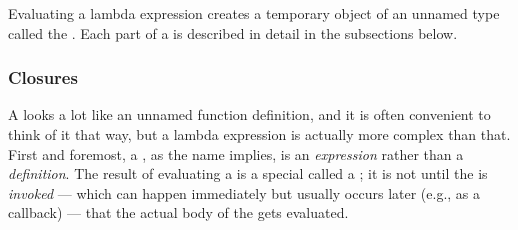 Evaluating a lambda expression creates a temporary 
object of an unnamed type called the . Each part of
a  is described in detail in the subsections
below.

\subsubsection[Closures]{Closures}\label{closures}

A  looks a lot like an unnamed function
definition, and it is often convenient to think of it that way, but a
lambda expression is actually more complex than that. First and
foremost, a , as the name implies, is an
\emph{expression} rather than a \emph{definition}. The result of
evaluating a  is a special  called a ; it is not until the
 is \emph{invoked} --- which can happen immediately but
usually occurs later (e.g., as a callback) --- that the actual body of
the  gets evaluated.

